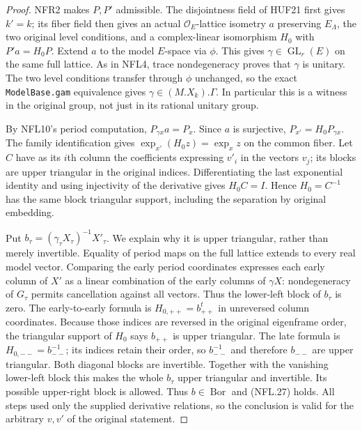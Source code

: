 \begin{proof}
NFR2 makes $P,P'$ admissible.  The disjointness field of HUF21
first gives $k'=k$; its fiber field then gives an actual
$\mathcal O_E$-lattice isometry $a$ preserving $E_\Lambda$,
the two original level conditions, and a complex-linear
isomorphism $H_0$ with $P'a=H_0P$.
Extend $a$ to the model $E$-space via $\phi$.  This gives
$\gamma\in\operatorname{GL}_r(E)$ on the same full lattice.
As in NFL4, trace nondegeneracy proves that $\gamma$ is unitary.
The two level conditions transfer through $\phi$ unchanged,
so the exact \texttt{ModelBase.gam} equivalence gives
$\gamma\in(M.X_k).\Gamma$.  In particular this is a witness
in the original group, not just in its rational unitary group.

By NFL10's period computation, $P_{\gamma x}a=P_x$.
Since $a$ is surjective, $P_{x'}=H_0P_{\gamma x}$.
The family identification gives
$\exp_{x'}(H_0z)=\exp_xz$ on the common fiber.
Let $C$ have as its $i$th column the coefficients expressing
$v'_i$ in the vectors $v_j$; its blocks are upper triangular
in the original indices.  Differentiating the last exponential
identity and using injectivity of the derivative gives
$H_0C=I$.  Hence $H_0=C^{-1}$ has the same block triangular
support, including the separation by original embedding.

Put $b_\tau=(\gamma_\tau X_\tau)^{-1}X'_\tau$.
We explain why it is upper triangular, rather than merely
invertible.  Equality of period maps on the full lattice
extends to every real model vector.  Comparing the early
period coordinates expresses each early column of $X'$ as a
linear combination of the early columns of $\gamma X$:
nondegeneracy of $G_\tau$ permits cancellation against all
vectors.  Thus the lower-left block of $b_\tau$ is zero.
The early-to-early formula is $H_{0,++}=b_{++}^t$ in unreversed
column coordinates.  Because those indices are reversed in
the original eigenframe order, the triangular support of
$H_0$ says $b_{++}$ is upper triangular.  The late formula is
$H_{0,--}=b_{--}^{-1}$; its indices retain their order, so
$b_{--}^{-1}$ and therefore $b_{--}$ are upper triangular.
Both diagonal blocks are invertible.  Together with the
vanishing lower-left block this makes the whole $b_\tau$
upper triangular and invertible.  Its possible upper-right
block is allowed.  Thus $b\in\operatorname{Bor}$ and (NFL.27)
holds.  All steps used only the supplied derivative relations,
so the conclusion is valid for the arbitrary $v,v'$ of the
original statement.
\end{proof}


